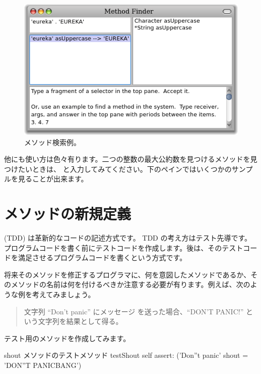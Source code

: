 \documentclass[a4paper,10pt,twoside]{book}
\begin{document}
{{\begin{figure}[hbt]
\centerline {\includegraphics[width=\textwidth]{MethodFinder-example1}}
\caption{メソッド検索例。
}
\end{figure}

他にも使い方は色々有ります。二つの整数の最大公約数を見つけるメソッドを見つけたいときは、 と入力してみてください。下のペインではいくつかのサンプルを見ることが出来ます。

\section{メソッドの新規定義}

\cite{Beck03a} (TDD) は革新的なコードの記述方式です。
TDD の考え方はテスト先導です。プログラムコードを書く前にテストコードを作成します。後は、そのテストコードを満足させるプログラムコードを書くという方式です。

将来そのメソッドを修正するプログラマに、何を意図したメソッドであるか、そのメソッドの名前は何を付けるべきか注意する必要が有ります。例えば、次のような例を考えてみましょう。

\begin{quote}
文字列 ``Don't panic'' にメッセージ  を送った場合、``DON'T PANIC!'' という文字列を結果として得る。
\end{quote}

\noindent
テスト用のメソッドを作成してみます。

\begin{method}[testShout]{shout メソッドのテストメソッド}
testShout
	self assert: ('Don''t panic' shout = 'DON''T PANICBANG')
\end{method} %

}}
\end{document}
